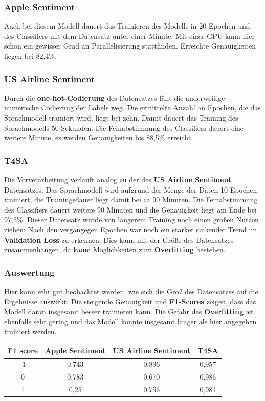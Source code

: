\subsubsection*{Apple Sentiment}
Auch bei diesem Modell dauert das Trainieren des Modells in 20 Epochen und des Classifiers mit dem Datensatz unter einer Minute. Mit einer GPU kann hier schon ein gewisser Grad an Parallelisierung stattfinden.  Erreichte Genauigkeiten liegen bei 82,4\%. 


\subsubsection*{US Airline Sentiment}
Durch die \textbf{one-hot-Codierung} des Datensatzes f\"allt die anderweitige numerische Codierung der Labels weg. Die ermittelte Anzahl an Epochen, die das Sprachmodell trainiert wird, liegt bei zehn. Damit dauert das Training des Sprachmodells 50 Sekunden. Die Feinabstimmung des Classifiers dauert eine weitere Minute, es werden Genauigkeiten bis 88,5\% erreicht.

\subsubsection*{T4SA}
Die Vorverarbeitung verl\"auft analog zu der des \textbf{US Airline Sentiment} Datensatzes. Das Sprachmodell wird aufgrund der Menge der Daten 10 Epochen trainiert, die Trainingsdauer liegt damit bei ca 90 Minuten. Die Feinabstimmung des Classifiers dauert weitere 90 Minuten und die Genauigkeit liegt am Ende bei 97,5\%. Dieser Datensatz w\"urde von l\"angerem Training noch einen gro{\ss}en Nutzen ziehen: Nach den vergangegen Epochen war noch ein starker sinkender Trend im \textbf{Validation Loss}  zu erkennen. Dies kann mit der Gr\"o{\ss}e des Datensatzes zusammenh\"angen, da kaum M\"oglichkeiten zum \textbf{Overfitting} bestehen.

\subsubsection*{Auswertung}
Hier kann sehr gut beobachtet werden, wie sich die Gr\"o{\ss} des Datensatzes auf die Ergebnisse auswirkt: Die steigende Genauigkeit und \textbf{F1-Scores} zeigen, dass das Modell daran insgesamt besser trainieren kann. Die Gefahr des \textbf{Overfitting} ist ebenfalls sehr gering und das Modell k\"onnte insgesamt l\"anger als hier angegeben trainiert werden.
\begin{center}
\begin{tabular}{|c||c|c|c|}
\hline
F1 score & Apple Sentiment & US Airline Sentiment & T4SA\\ 
\hline\hline
-1 & 0,743 & 0,896 & 0,957\\
\hline
0 & 0,783 & 0,670 & 0,986\\ 
\hline
1 & 0,25 & 0,756 &  0,981\\
\hline    
\end{tabular}
\end{center}

